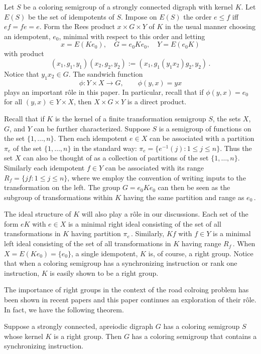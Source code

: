 Let $S$ be a coloring semigroup of a strongly connected digraph with kernel $K$.
Let $E(S)$ be the set of idempotents of $S$. 
Impose on $E(S)$ the order $e \le f$ iff $ef = fe = e$.
Form the Rees product $x \times G \times Y$ of $K$ in the usual manner choosing an idempotent, $e_0$, minimal with respect to this order and letting
\[
  x = E(Ke_0), \quad G = e_0Ke_0, \quad Y = E(e_0K)
\]
with product
\[
  (x_1,g_1,y_1)(x_2,g_2,y_2) := (x_1,g_1(y_1x_2)g_2,y_2)\,.
\]
Notice that $y_1x_2 \in G$.
The sandwich function
\[
  \phi: Y \times X \to G, \qquad \phi(y,x) = yx
\]
plays an important r\^ole in this paper.
In particular, recall that if $\phi(y,x) = e_0$ for all $(y,x) \in Y \times X$, then $X \times G \times Y$ is a direct product.

Recall that if $K$ is the kernel of a finite transformation semigroup $S$, the sets $X$, $G$, and $Y$ can be further characterized.
Suppose $S$ is a semigroup of functions on the set $\{1, \ldots , n\}$.
Then each idempotent $e \in X$ can be associated with a partition $\pi_e$ of the set $\{1, \ldots , n\}$ in the standard way: $\pi_e = \{e^{-1}(j): 1 \le j \le n \}$.
Thus the set $X$ can also be thought of as a collection of partitions of the set  $\{1, \ldots , n\}$.
Similarly each idempotent $f \in Y$ can be associated with its range $R_f = \{jf: 1 \le j \le n\}$, where we employ the convention of writing inputs to the transformation on the left.
The group $G = e_0Ke_0$ can then be seen as the subgroup of transformations within $K$ having the same partition and range as $e_0$\,.

The ideal structure of $K$ will also play a r\^ole in our discussions.
Each set of the form $eK$ with $e \in X$ is a minimal right ideal consisting of the set of all transformations in $K$ having partition $\pi_e$\,.
Similarly, $Kf$ with $f \in Y$ is a minimal left ideal consisting of the set of all transformations in $K$ having range $R_f$\,.
When $X = E(Ke_0) = \{e_0\}$, a single idempotent, $K$ is, of course, a right group.
Notice that when a coloring semigroup has a synchronizing instruction or rank one instruction, $K$ is easily shown to be a right group.

The importance of right groups in the context of the road colroing problem has been shown in recent papers \cite{B, CKK} and this paper continues an exploration of their r\^ole.
In fact, we have the following theorem.

%
\begin{theorem}    \label{thm:4.13}
Suppose a strongly connected, apreiodic digraph $G$ has a coloring semigroup $S$ whose kernel $K$ is a right group.
Then $G$ has a coloring semigroup that contains a synchronizing instruction.
\end{theorem}
%

